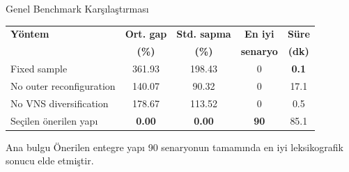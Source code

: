 \documentclass[aspectratio=169,11pt]{beamer}
\begin{document}
\begin{frame}{Genel Benchmark Karşılaştırması}
  \begin{table}
    \centering
    \small
    \begin{tabular}{lcccc}
      \toprule
      \textbf{Yöntem} & \textbf{Ort. gap} & \textbf{Std. sapma} & \textbf{En iyi} & \textbf{Süre} \\
      & \textbf{(\%)} & \textbf{(\%)} & \textbf{senaryo} & \textbf{(dk)} \\
      \midrule
      Fixed sample & 361.93 & 198.43 & 0 & \textbf{0.1} \\
      No outer reconfiguration & 140.07 & 90.32 & 0 & 17.1 \\
      No VNS diversification & 178.67 & 113.52 & 0 & 0.5 \\
      Seçilen önerilen yapı & \textbf{0.00} & \textbf{0.00} & \textbf{90} & 85.1 \\
      \bottomrule
    \end{tabular}
  \end{table}

  \begin{block}{Ana bulgu}
    Önerilen entegre yapı 90 senaryonun tamamında en iyi leksikografik sonucu elde etmiştir.
  \end{block}
\end{frame}
\end{document}
